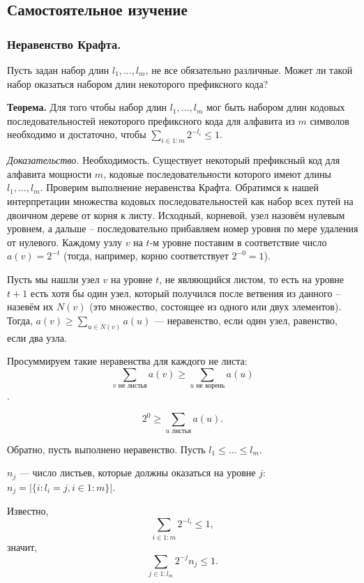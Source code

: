 \subsection{Самостоятельное изучение}
\subsubsection{Неравенство Крафта.}

Пусть задан набор длин $l_{1}, \ldots, l_{m}$, не все обязательно различные. Может ли такой набор оказаться набором длин некоторого префиксного кода? 

\textbf{Теорема.} Для того чтобы набор длин $l_{1}, \ldots, l_{m}$ мог быть набором длин кодовых последовательностей некоторого префиксного кода для алфавита из $m$ символов необходимо и достаточно, чтобы $\sum\limits_{i\in 1:m} 2^{-l_{i}} \leqslant 1$.

\textit{Доказательство.} Необходимость. Существует некоторый префиксный код для алфавита мощности $m$, кодовые последовательности которого имеют длины $l_{1}, \ldots, l_{m}$. Проверим выполнение неравенства Крафта. Обратимся к нашей интерпретации множества кодовых последовательностей как набор всех путей на двоичном дереве от корня к листу. Исходный, корневой, узел назовём нулевым уровнем, а дальше -- последовательно прибавляем номер уровня по мере удаления от нулевого. Каждому узлу $v$ на $t$-м уровне поставим в соответствие число $a(v) = 2^{-t}$ (тогда, например, корню соответствует $2^{-0} = 1$). 

Пусть мы нашли узел $v$ на уровне $t$, не являющийся листом, то есть на уровне $t+1$ есть хотя бы один узел, который получился после ветвения из данного -- назевём их $N(v)$ (это множество, состоящее из одного или двух элементов). Тогда, $a(v) \geqslant \sum\limits_{u \in N(v)} a(u)$ --- неравенство, если один узел, равенство, если два узла.

Просуммируем такие неравенства для каждого не листа: $$\sum\limits_{v \text{ не листья}} a(v) \geqslant \sum\limits_{u \text{ не корень}} a(u)$$.

$$2^{0} \geqslant \sum\limits_{u \text{ листья}} a(u).$$

Обратно, пусть выполнено неравенство. Пусть $l_{1}\leqslant \ldots \leqslant l_{m}$.

$n_{j}$ --- число листьев, которые должны оказаться на уровне $j$: $n_{j} = |\{i: l_{i} = j, i\in 1:m\}|$.

Известно, $$\sum\limits_{i\in 1:m} 2^{-l_{i}} \leqslant 1,$$ значит, $$\sum\limits_{j\in 1:l_{m}} 2^{-{j}} n_{j} \leqslant 1.$$

